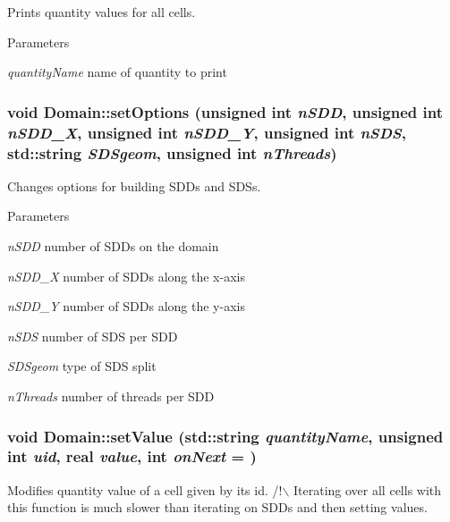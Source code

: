 Prints quantity values for all cells. 
\begin{DoxyParams}{Parameters}
\item[{\em quantityName}]name of quantity to print \end{DoxyParams}
\hypertarget{classDomain_a10a5e8384b21bb3c968699c2a6c89bf7}{
\subsubsection[{setOptions}]{\setlength{\rightskip}{0pt plus 5cm}void Domain::setOptions (unsigned int {\em nSDD}, \/  unsigned int {\em nSDD\_\-X}, \/  unsigned int {\em nSDD\_\-Y}, \/  unsigned int {\em nSDS}, \/  std::string {\em SDSgeom}, \/  unsigned int {\em nThreads})}}
\label{classDomain_a10a5e8384b21bb3c968699c2a6c89bf7}


Changes options for building SDDs and SDSs. 
\begin{DoxyParams}{Parameters}
\item[{\em nSDD}]number of SDDs on the domain \item[{\em nSDD\_\-X}]number of SDDs along the x-\/axis \item[{\em nSDD\_\-Y}]number of SDDs along the y-\/axis \item[{\em nSDS}]number of SDS per SDD \item[{\em SDSgeom}]type of SDS split \item[{\em nThreads}]number of threads per SDD \end{DoxyParams}
\hypertarget{classDomain_a9319e738fbd4ada8145998d5392c9334}{
\subsubsection[{setValue}]{\setlength{\rightskip}{0pt plus 5cm}void Domain::setValue (std::string {\em quantityName}, \/  unsigned int {\em uid}, \/  real {\em value}, \/  int {\em onNext} = {})}}
\label{classDomain_a9319e738fbd4ada8145998d5392c9334}


Modifies quantity value of a cell given by its id. /!$\backslash$ Iterating over all cells with this function is much slower than iterating on SDDs and then setting values.


